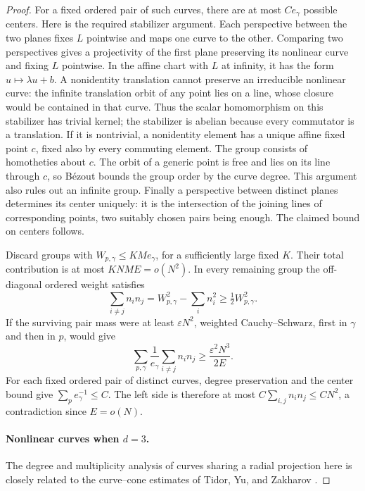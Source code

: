\begin{proof}
For a fixed ordered pair of such curves, there are at most $C e_\gamma$ possible centers. Here is the required stabilizer argument. Each perspective between the two planes fixes $L$ pointwise and maps one curve to the other. Comparing two perspectives gives a projectivity of the first plane preserving its nonlinear curve and fixing $L$ pointwise. In the affine chart with $L$ at infinity, it has the form $u\mapsto\lambda u+b$. A nonidentity translation cannot preserve an irreducible nonlinear curve: the infinite translation orbit of any point lies on a line, whose closure would be contained in that curve. Thus the scalar homomorphism on this stabilizer has trivial kernel; the stabilizer is abelian because every commutator is a translation. If it is nontrivial, a nonidentity element has a unique affine fixed point $c$, fixed also by every commuting element. The group consists of homotheties about $c$. The orbit of a generic point is free and lies on its line through $c$, so B\'ezout bounds the group order by the curve degree. This argument also rules out an infinite group. Finally a perspective between distinct planes determines its center uniquely: it is the intersection of the joining lines of corresponding points, two suitably chosen pairs being enough. The claimed bound on centers follows.

Discard groups with $W_{p,\gamma}\le KMe_\gamma$, for a sufficiently large fixed $K$. Their total contribution is at most $KNME=o(N^2)$. In every remaining group the off-diagonal ordered weight satisfies
\[
 \sum_{i\ne j}n_i n_j
   =W_{p,\gamma}^2-\sum_i n_i^2
   \ge\tfrac12 W_{p,\gamma}^2.
\]
If the surviving pair mass were at least $\varepsilon N^2$, weighted Cauchy--Schwarz, first in $\gamma$ and then in $p$, would give
\[
 \sum_{p,\gamma}\frac{1}{e_\gamma}\sum_{i\ne j}n_i n_j
 \ge \frac{\varepsilon^2N^3}{2E}.
\]
For each fixed ordered pair of distinct curves, degree preservation and the center bound give $\sum_p e_\gamma^{-1}\le C$. The left side is therefore at most $C\sum_{i,j}n_i n_j\le CN^2$, a contradiction since $E=o(N)$.

\paragraph{Nonlinear curves when $d=3$.}
The degree and multiplicity analysis of curves sharing a radial projection here is closely related to the curve--cone estimates of Tidor, Yu, and Zakharov \cite[Sections~10.2--10.3]{tidoryuzakharov2026}.


\end{proof}

